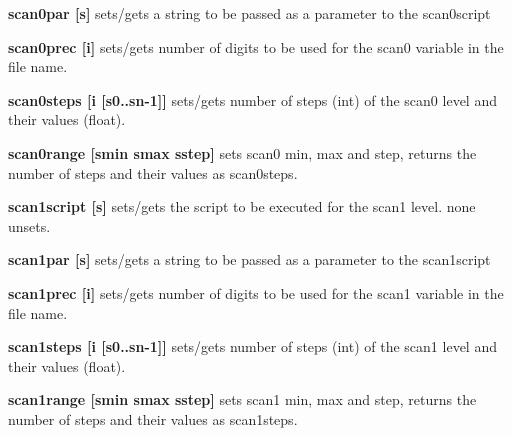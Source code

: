 \begin{DoxyItemize}
\item {\bfseries scan0par \mbox{[}s\mbox{]}} sets/gets a string to be passed as a parameter to the scan0script
\end{DoxyItemize}


\begin{DoxyItemize}
\item {\bfseries scan0prec \mbox{[}i\mbox{]}} sets/gets number of digits to be used for the scan0 variable in the file name.
\end{DoxyItemize}


\begin{DoxyItemize}
\item {\bfseries scan0steps \mbox{[}i \mbox{[}s0..sn-\/1\mbox{]}\mbox{]}} sets/gets number of steps (int) of the scan0 level and their values (float).
\end{DoxyItemize}


\begin{DoxyItemize}
\item {\bfseries scan0range \mbox{[}smin smax sstep\mbox{]}} sets scan0 min, max and step, returns the number of steps and their values as scan0steps.
\end{DoxyItemize}


\begin{DoxyItemize}
\item {\bfseries scan1script \mbox{[}s\mbox{]}} sets/gets the script to be executed for the scan1 level. {\ttfamily none} unsets.
\end{DoxyItemize}


\begin{DoxyItemize}
\item {\bfseries scan1par \mbox{[}s\mbox{]}} sets/gets a string to be passed as a parameter to the scan1script
\end{DoxyItemize}


\begin{DoxyItemize}
\item {\bfseries scan1prec \mbox{[}i\mbox{]}} sets/gets number of digits to be used for the scan1 variable in the file name.
\end{DoxyItemize}


\begin{DoxyItemize}
\item {\bfseries scan1steps \mbox{[}i \mbox{[}s0..sn-\/1\mbox{]}\mbox{]}} sets/gets number of steps (int) of the scan1 level and their values (float).
\end{DoxyItemize}


\begin{DoxyItemize}
\item {\bfseries scan1range \mbox{[}smin smax sstep\mbox{]}} sets scan1 min, max and step, returns the number of steps and their values as scan1steps. 
\end{DoxyItemize}